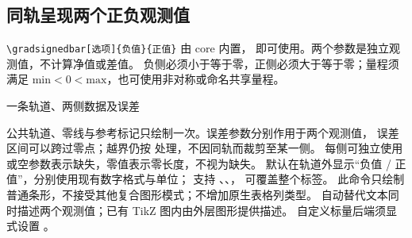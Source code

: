

\subsection{同轨呈现两个正负观测值}
\verb|\gradsignedbar[选项]{负值}{正值}| 由 core 内置，
 即可使用。两个参数是独立观测值，不计算净值或差值。
负侧必须小于等于零，正侧必须大于等于零；量程须满足
$\mathrm{min}<0<\mathrm{max}$，也可使用非对称或命名共享量程。
\begin{example}{一条轨道、两侧数据及误差}


\end{example}
公共轨道、零线与参考标记只绘制一次。误差参数分别作用于两个观测值，
误差区间可以跨过零点；越界仍按  处理，不因同轨而裁剪至某一侧。
每侧可独立使用  或空参数表示缺失，零值表示零长度，不视为缺失。
默认在轨道外显示“负值 / 正值”，分别使用现有数字格式与单位；
支持 、、， 可覆盖整个标签。
此命令只绘制普通条形，不接受其他复合图形模式；不增加原生表格列类型。
自动替代文本同时描述两个观测值；已有 TikZ 图内由外层图形提供描述。
自定义标量后端须显式设置 。
